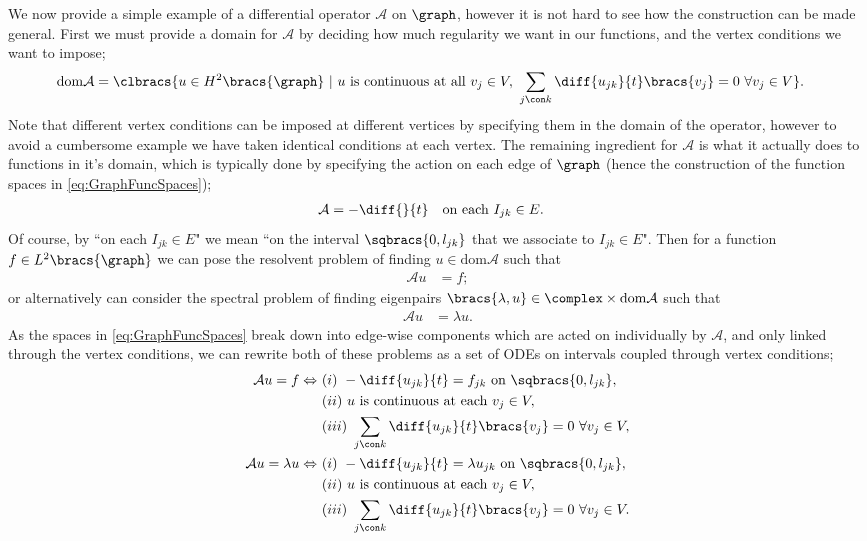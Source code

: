 We now provide a simple example of a differential operator $\mathcal{A}$ on $\graph$, however it is not hard to see how the construction can be made general.
First we must provide a domain for $\mathcal{A}$ by deciding how much regularity we want in our functions, and the vertex conditions we want to impose;
\begin{align} \label{eq:ExampleOppDomainDef}
	\mathrm{dom}\mathcal{A} &= \clbracs{ u\in H^2\bracs{\graph} \ \vert \ u \text{ is continuous at all } v_j\in V, \ \sum_{j\con k}\diff{u_{jk}}{t}\bracs{v_j} = 0 \ \forall v_j\in V}.
\end{align}
Note that different vertex conditions can be imposed at different vertices by specifying them in the domain of the operator, however to avoid a cumbersome example we have taken identical conditions at each vertex.
The remaining ingredient for $\mathcal{A}$ is what it actually does to functions in it's domain, which is typically done by specifying the action on each edge of $\graph$ (hence the construction of the function spaces in \eqref{eq:GraphFuncSpaces});
\begin{align} \label{eq:ExampleOppEdgeDef}
	\mathcal{A} &= -\diff{}{t} \quad\text{on each } I_{jk}\in E.
\end{align}
Of course, by ``on each $I_{jk}\in E$" we mean ``on the interval $\sqbracs{0,l_{jk}}$ that we associate to $I_{jk}\in E$".
Then for a function $f\in L^2\bracs{\graph}$ we can pose the resolvent problem of finding $u\in\mathrm{dom}\mathcal{A}$ such that
\begin{align*}
	\mathcal{A}u &= f;
\end{align*}
or alternatively can consider the spectral problem of finding eigenpairs $\bracs{\lambda,u}\in\complex\times\mathrm{dom}\mathcal{A}$ such that
\begin{align*}
	\mathcal{A}u &= \lambda u.
\end{align*}
As the spaces in \eqref{eq:GraphFuncSpaces} break down into edge-wise components which are acted on individually by $\mathcal{A}$, and only linked through the vertex conditions, we can rewrite both of these problems as a set of ODEs on intervals coupled through vertex conditions;
\begin{align*}
	\mathcal{A}u = f \Leftrightarrow \
	& (i) \ -\diff{u_{jk}}{t} = f_{jk} \ \text{on } \sqbracs{0,l_{jk}}, \\
	& (ii) \ u \text{ is continuous at each } v_j\in V, \\
	& (iii) \ \sum_{j\con k}\diff{u_{jk}}{t}\bracs{v_j} = 0 \ \forall v_j\in V, \\
	\mathcal{A}u = \lambda u \Leftrightarrow \
	& (i) \ -\diff{u_{jk}}{t} = \lambda u_{jk} \ \text{on } \sqbracs{0,l_{jk}}, \\
	& (ii) \ u \text{ is continuous at each } v_j\in V, \\
	& (iii) \ \sum_{j\con k}\diff{u_{jk}}{t}\bracs{v_j} = 0 \ \forall v_j\in V.
\end{align*}
